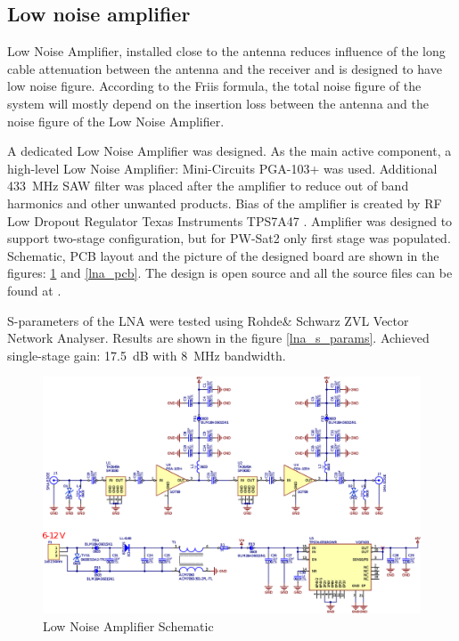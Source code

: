\subsection{Low noise amplifier}
Low Noise Amplifier, installed close to the antenna reduces influence of the long cable attenuation between the antenna and the receiver and is designed to have low noise figure. According to the Friis formula, the total noise figure of the system will mostly depend on the insertion loss between the antenna and the noise figure of the Low Noise Amplifier. 

A dedicated Low Noise Amplifier was designed. As the main active component, a high-level Low Noise Amplifier: Mini-Circuits PGA-103+ \cite{lna_pga_datasheet} was used. Additional \SI{433}{\MHz} SAW filter was placed after the amplifier to reduce out of band harmonics and other unwanted products. Bias of the amplifier is created by RF Low Dropout Regulator Texas Instruments TPS7A47 \cite{lna_ldo_datasheet}. Amplifier was designed to support two-stage configuration, but for PW-Sat2 only first stage was populated. Schematic, PCB layout and the picture of the designed board are shown in the figures: \ref{lna_schematic} and \ref{lna_pcb}. The design is open source and all the source files can be found at \cite{lna_github}.

S-parameters of the LNA were tested using Rohde\& Schwarz ZVL Vector Network Analyser. Results are shown in the figure \ref{lna_s_params}. Achieved single-stage gain: \SI{17.5}{\dB} with \SI{8}{\MHz} bandwidth.

\begin{landscape}
\begin{figure}
    \centering
    \includegraphics[width=1.2\paperwidth]{img/5/lna_schematic.eps}
    \caption{Low Noise Amplifier Schematic}
    \label{lna_schematic}
\end{figure}
\end{landscape}

